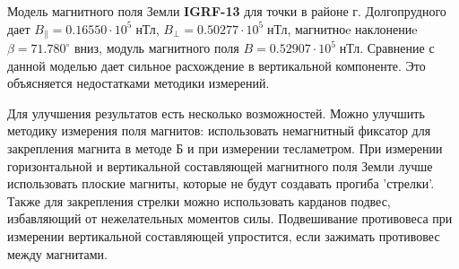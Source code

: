 \documentclass[12pt,a4paper]{article}
\begin{document}
	Модель магнитного поля Земли \textbf{IGRF-13}
	для точки в районе г. Долгопрудного дает $B_\parallel = 0.16550 \cdot 10^5 \; \text{нТл}$, $B_\perp = 0.50277 \cdot 10^5 \; \text{нТл}$, магнитноe наклонениe $\beta = 71.780 ^\circ$ вниз, модуль магнитного поля $B = 0.52907 \cdot 10^5 \; \text{нТл}$. Сравнение с данной моделью дает сильное расхождение в вертикальной компоненте. Это объясняется недостатками методики измерений.
	
	Для улучшения результатов есть несколько возможностей. Можно улучшить методику измерения поля магнитов: использовать немагнитный фиксатор для закрепления магнита в методе Б и при измерении тесламетром. При измерении горизонтальной и вертикальной составляющей магнитного поля Земли лучше использовать плоские магниты, которые не будут создавать прогиба 'стрелки'. Также для закрепления стрелки можно использовать карданов подвес, избавляющий от нежелательных моментов силы. Подвешивание противовеса при измерении вертикальной составляющей упростится, если зажимать противовес между магнитами.
	
\end{document}
